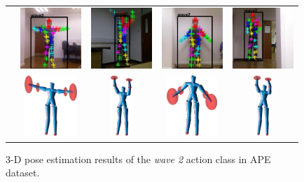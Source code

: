 \begin{figure}
	\centering 
	\begin{tabular}{ccccc}
		\raisebox{1cm}{Input} &
		\includegraphics[height=2.3cm]{fig/body/APE/wave21.jpg} & 
		\includegraphics[height=2.3cm]{fig/body/APE/wave22.jpg} &
		\includegraphics[height=2.3cm]{fig/body/APE/wave23.jpg} & 
		\includegraphics[height=2.3cm]{fig/body/APE/wave24.jpg} \\
		\raisebox{1cm}{3-D Pose} &
		\includegraphics[height=2.3cm]{fig/body/APE/wave21.png} & 
		\includegraphics[height=2.3cm]{fig/body/APE/wave22.png} &
		\includegraphics[height=2.3cm]{fig/body/APE/wave23.png} & 
		\includegraphics[height=2.3cm]{fig/body/APE/wave24.png} 
	\end{tabular}
	\label{fig/body/APE/wave2} 
	\caption{3-D pose estimation results of the \emph{wave 2} action class in APE dataset.}
	\label{fig/body/APE3}
\end{figure}

